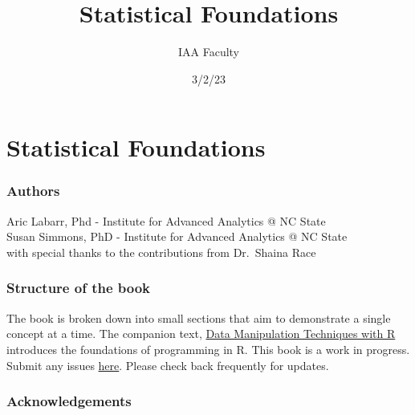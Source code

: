 \documentclass[
  letterpaper,
  DIV=11,
  numbers=noendperiod]{scrreprt}
\title{Statistical Foundations}
\author{IAA Faculty}
\date{3/2/23}
\renewcommand*\contentsname{Table of contents}
\newcommand\contentsname{Table of contents}
\begin{document}
\maketitle
\ifdefined\Shaded\renewenvironment{Shaded}{\begin{tcolorbox}[enhanced, frame hidden, boxrule=0pt, breakable, borderline west={3pt}{0pt}{shadecolor}, sharp corners, interior hidden]}{\end{tcolorbox}}\fi

\renewcommand*\contentsname{Table of contents}
{
\hypersetup{linkcolor=}
\setcounter{tocdepth}{2}
\tableofcontents
}

\hypertarget{statistical-foundations}{%
\chapter{Statistical Foundations}\label{statistical-foundations}}

\hypertarget{authors}{%
\subsection*{Authors}\label{authors}}

Aric Labarr, Phd - Institute for Advanced Analytics @ NC State\\
Susan Simmons, PhD - Institute for Advanced Analytics @ NC State\\

with special thanks to the contributions from Dr.~Shaina Race

\hypertarget{structure-of-the-book}{%
\subsection*{Structure of the book}\label{structure-of-the-book}}

The book is broken down into small sections that aim to demonstrate a
single concept at a time. The companion text,
\href{https://andreavillanes.github.io/R_Data_Manipulation_Techniques/}{Data
Manipulation Techniques with R} introduces the foundations of
programming in R. This book is a work in progress. Submit any issues
\href{https://https://github.com/IAA-Faculty/statistical_foundations/issues}{here}.
Please check back frequently for updates.

\hypertarget{acknowledgements}{%
\subsection*{Acknowledgements}\label{acknowledgements}}
\end{document}
